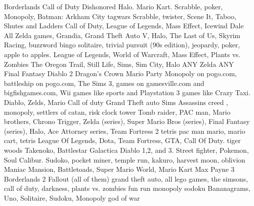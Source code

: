 Borderlands  Call of Duty  Dishonored
Halo. Mario Kart. 
Scrabble, poker, Monopoly, Batman: Arkham City
tagwars
Scrabble, twister, Scene It, Taboo, Shutes and Ladders
Call of Duty, League of Legends, Mass Effect, Icewind Dale
All Zelda games, Grandia, Grand Theft Auto V, Halo, The Last of Us, Skyrim
Racing, buzzword bingo
solitaire, trivial pursuit (90s edition), jeopardy, poker, apple to apples.
League of Legends, World of Warcraft, Mass Effect, Plants vs. Zombies
The Oregon Trail, Still Life, Sims, Sim City, Halo
ANY Zelda  ANY Final Fantasy  Diablo 2  Dragon's Crown  Mario Party
Monopoly on pogo.com, battleship on pogo.com, The Sims 3, games on gamesville.com and bigfishgames.com, Wii games like sports and Playstation 3 games like Crazy Taxi.
Diablo, Zelds, Mario
Call of duty  Grand Theft auto  Sims
Assassins creed , monopoly, settlers of catan, risk
clock tower
Tomb raider, PAC man, Mario brothers, 
Chrono Trigger, Zelda (series), Super Mario Bros (series), Final Fantasy (series), Halo,  
Ace Attorney series, Team Fortress 2
tetris pac man
mario, mario cart, tetris
League Of Legends, Dota, Team Fortress, GTA, Call Of Duty.
tiger woods
Takenoko, Battlestar Galactica
Diablo 1,2, and 3. Street fighter, Pokemon, Soul Calibur.
Sudoko, pocket miner, temple run, kakuro, harvest moon, oblivion
Maniac Mansion, Battletoads, Super Mario World, Mario Kart
Max Payne 3  Borderlands 2  Fallout (all of them)
grand theft auto, all lego games, the simsons, call of duty, darkness, 
plants vs. zombies  fun run  monopoly  sodoku
Bananagrams, Uno, Solitaire, Sudoku, Monopoly
god of war

